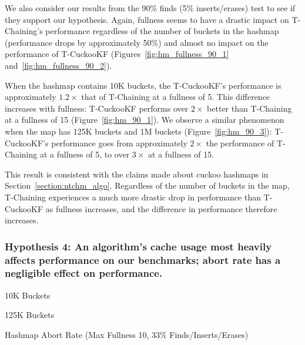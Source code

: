 We also consider our results from the 90\% finds (5\% inserts/erases) test to see if they support our hypothesis.
Again, fullness seems to have a drastic impact on T-Chaining's performance regardless of the number of buckets in the hashmap (performance drops by approximately 50\%) and almost no impact on the performance of T-CuckooKF (Figures~\ref{fig:hm_fullness_90_1} and~\ref{fig:hm_fullness_90_2}). 

When the hashmap contains 10K buckets, the T-CuckooKF's performance is approximately $1.2\times$ that of T-Chaining at a fullness of 5. This difference increases with fullness: T-CuckooKF performs over $2\times$ better than T-Chaining at a fullness of 15 (Figure~\ref{fig:hm_90_1}).
We observe a similar phenomenon when the map has 125K buckets and 1M buckets (Figure~\ref{fig:hm_90_3}): T-CuckooKF's performance goes from approximately $2\times$ the performance of T-Chaining at a fullness of 5, to over $3\times$ at a fullness of 15.
 
This result is consistent with the claims made about cuckoo hashmaps in Section~\ref{section:ntchm_algo}. Regardless of the number of buckets in the map, T-Chaining experiences a much more drastic drop in performance than T-CuckooKF as fullness increases, and the difference in performance therefore increases.

\vspace{12pt}
\noindent{}

\subsubsection{Hypothesis 4: An algorithm's cache usage most heavily affects performance on our benchmarks; abort rate has a negligible effect on performance.}

    \begin{table}[t]
    \centering
	\singlespace
        \begin{minipage}{0.5\textwidth}
        \centering
        
        \caption*{10K Buckets}
            \vspace{12pt}
        \end{minipage}
        \begin{minipage}{0.5\textwidth}
        \centering
        
        \caption*{125K Buckets}
        \end{minipage}
        \caption{Hashmap Abort Rate (Max Fullness 10, 33\% Finds/Inserts/Erases)}
		\label{tab:hm_aborts}
    \end{table}


